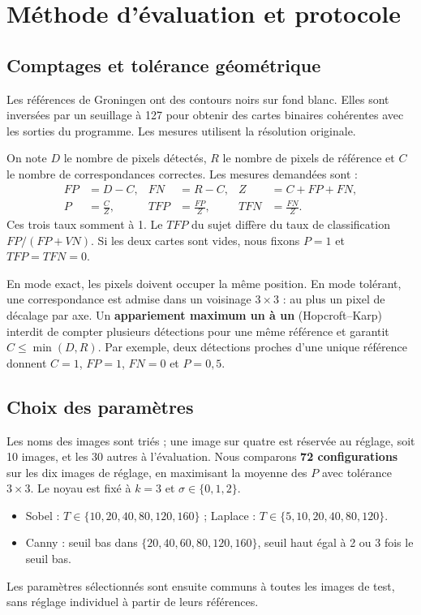 \section{Méthode d'évaluation et protocole}
\subsection{Comptages et tolérance géométrique}
Les références de Groningen ont des contours noirs sur fond blanc. Elles sont inversées par un seuillage à 127 pour obtenir des cartes binaires cohérentes avec les sorties du programme. Les mesures utilisent la résolution originale.

On note $D$ le nombre de pixels détectés, $R$ le nombre de pixels de référence et $C$ le nombre de correspondances correctes. Les mesures demandées sont :
\begin{align*}
  FP &= D-C, & FN &= R-C, & Z &= C+FP+FN,\\
  P &= \frac{C}{Z}, & TFP &= \frac{FP}{Z}, & TFN &= \frac{FN}{Z}.
\end{align*}
Ces trois taux somment à 1. Le $TFP$ du sujet diffère du taux de classification $FP/(FP+VN)$. Si les deux cartes sont vides, nous fixons $P=1$ et $TFP=TFN=0$.

En mode exact, les pixels doivent occuper la même position. En mode tolérant, une correspondance est admise dans un voisinage $3\times3$ : au plus un pixel de décalage par axe. Un \textbf{appariement maximum un à un} (Hopcroft--Karp) interdit de compter plusieurs détections pour une même référence et garantit $C\leq\min(D,R)$. Par exemple, deux détections proches d'une unique référence donnent $C=1$, $FP=1$, $FN=0$ et $P=0{,}5$.

\subsection{Choix des paramètres}
Les noms des images sont triés ; une image sur quatre est réservée au réglage, soit 10 images, et les 30 autres à l'évaluation. Nous comparons \textbf{72 configurations} sur les dix images de réglage, en maximisant la moyenne des $P$ avec tolérance $3\times3$. Le noyau est fixé à $k=3$ et $\sigma\in\{0,1,2\}$.
\begin{itemize}
  \item Sobel : $T\in\{10,20,40,80,120,160\}$ ; Laplace : $T\in\{5,10,20,40,80,120\}$.
  \item Canny : seuil bas dans $\{20,40,60,80,120,160\}$, seuil haut égal à 2 ou 3 fois le seuil bas.
\end{itemize}
Les paramètres sélectionnés sont ensuite communs à toutes les images de test, sans réglage individuel à partir de leurs références.

